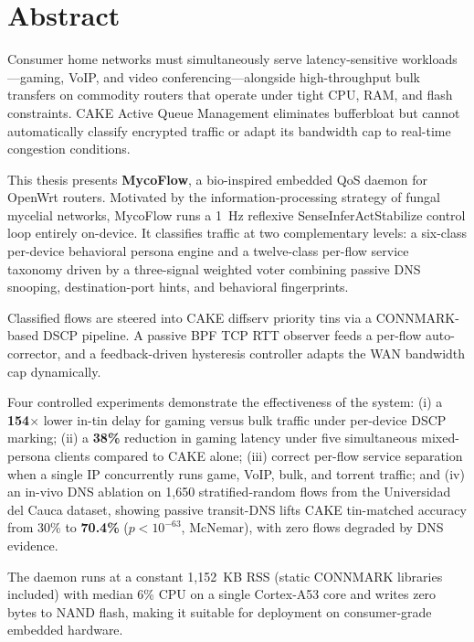 \chapter*{Abstract}

Consumer home networks must simultaneously serve latency-sensitive workloads---gaming, VoIP, and video conferencing---alongside high-throughput bulk transfers on commodity routers that operate under tight CPU, RAM, and flash constraints. CAKE Active Queue Management eliminates bufferbloat but cannot automatically classify encrypted traffic or adapt its bandwidth cap to real-time congestion conditions.

This thesis presents \textbf{MycoFlow}, a bio-inspired embedded QoS daemon for OpenWrt routers. Motivated by the information-processing strategy of fungal mycelial networks, MycoFlow runs a 1~Hz reflexive Sense\textrightarrow{}Infer\textrightarrow{}Act\textrightarrow{}Stabilize control loop entirely on-device. It classifies traffic at two complementary levels: a six-class per-device behavioral persona engine and a twelve-class per-flow service taxonomy driven by a three-signal weighted voter combining passive DNS snooping, destination-port hints, and behavioral fingerprints.

Classified flows are steered into CAKE diffserv priority tins via a CONNMARK-based DSCP pipeline. A passive BPF TCP RTT observer feeds a per-flow auto-corrector, and a feedback-driven hysteresis controller adapts the WAN bandwidth cap dynamically.

Four controlled experiments demonstrate the effectiveness of the system:
(i) a \textbf{154$\times$} lower in-tin delay for gaming versus bulk traffic under per-device DSCP marking;
(ii) a \textbf{38\%} reduction in gaming latency under five simultaneous mixed-persona clients compared to CAKE alone;
(iii) correct per-flow service separation when a single IP concurrently runs game, VoIP, bulk, and torrent traffic; and
(iv) an in-vivo DNS ablation on 1,650 stratified-random flows from the Universidad del Cauca dataset, showing passive transit-DNS lifts CAKE tin-matched accuracy from 30\% to \textbf{70.4\%} ($p < 10^{-63}$, McNemar), with zero flows degraded by DNS evidence.

The daemon runs at a constant 1,152~KB RSS (static CONNMARK libraries included) with median 6\% CPU on a single Cortex-A53 core and writes zero bytes to NAND flash, making it suitable for deployment on consumer-grade embedded hardware.

